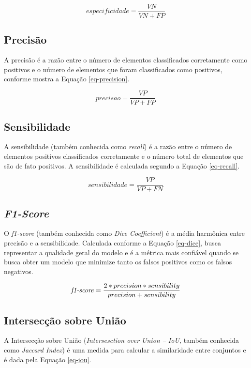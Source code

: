 \begin{equation}
especificidade = \frac{VN}{VN + FP}
\label{eq-specificity}
\end{equation}

\subsection{Precisão}
A precisão é a razão entre o número de elementos classificados corretamente como positivos e o número de elementos que foram classificados como positivos, conforme mostra a Equação \ref{eq-precision}.

\begin{equation}
precisao = \frac{VP}{VP + FP}
\label{eq-precision}
\end{equation}

\subsection{Sensibilidade}
A sensibilidade (também conhecida como \textit{recall}) é a razão entre o número de elementos positivos classificados corretamente e o número total de elementos que são de fato positivos. A sensibilidade é calculada segundo a Equação \ref{eq-recall}.

\begin{equation}
sensibilidade = \frac{VP}{VP + FN}
\label{eq-recall}
\end{equation}

\subsection{\textit{F1-Score}}
O \textit{f1-score} (também conhecida como \textit{Dice Coefficient}) é a média harmônica entre precisão e a sensibilidade. Calculada conforme a Equação \ref{eq-dice}, busca representar a qualidade geral do modelo e é a métrica mais confiável quando se busca obter um modelo que minimize tanto os falsos positivos como os falsos negativos.

\begin{equation}
\mbox{\textit{f1-score}} = \frac{2 * precision * sensibility}{precision + sensibility}
\label{eq-dice}
\end{equation}

\subsection{Intersecção sobre União}
A Intersecção sobre União (\emph{Intersesction over Union -- IoU,} também conhecida como \textit{Jaccard Index}) é uma medida para calcular a similaridade entre conjuntos e é dada pela Equação \ref{eq-iou}.

